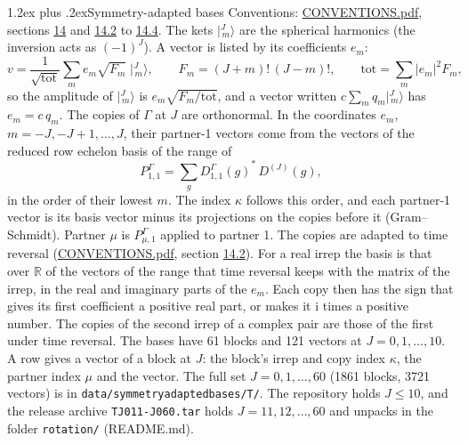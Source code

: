 \documentclass[10pt,a4paper]{article}
\makeatletter
\renewcommand\section{\@startsection{section}{1}{\z@}{-3ex plus -1ex minus -.2ex}%
  {1.2ex plus .2ex}{\normalfont\large\sffamily\bfseries\color{parttitle}}}
\numberwithin{equation}{section}
\newcommand{\iunit}{\mathrm{i}}
\newcommand{\irrJ}[1]{D^{(#1)}}
\newcommand{\repD}[1]{D^{#1}}
\newcommand{\conj}[1]{{#1}^{*}}
\newcommand{\mult}{\kappa}
\newcommand{\intx}{\mu}
\newcommand{\jm}[2]{\bigl\lvert{}^{#1}_{\,#2}\bigr\rangle}
\makeatother
\begin{document}
\section{Symmetry-adapted bases}\label{s:bases}
Conventions: \href{../../CONVENTIONS.pdf}{CONVENTIONS.pdf}, sections \href{../../CONVENTIONS.pdf\#conv.14}{14} and \href{../../CONVENTIONS.pdf\#conv.14.2}{14.2} to \href{../../CONVENTIONS.pdf\#conv.14.4}{14.4}.
\leavevmode\label{n:index.m}\label{n:vector.ket}The kets $\jm{J}{m}$ are the spherical harmonics (the inversion acts as $(-1)^J$). \label{n:index.ketcoefficient}\label{n:vector.basis.symmetry}\label{n:index.ketweight}\label{n:index.total}A vector is listed by its coefficients $e_m$:
\begin{equation}\label{e:ket}v = \frac{1}{\sqrt{\mathrm{tot}}}\sum_m e_m\sqrt{F_m}\;\jm{J}{m},\qquad F_m = (J+m)!\,(J-m)!,\qquad \mathrm{tot} = \sum_m |e_m|^2F_m,\end{equation}
\leavevmode\label{n:index.factor.c}\label{n:index.multiplicity.copies}so the amplitude of $\jm{J}{m}$ is $e_m\sqrt{F_m/\mathrm{tot}}$, and a vector written $c\sum_m q_m\jm{J}{m}$ has $e_m = c\,q_m$.
The copies of $\Gamma$ at $J$ are orthonormal. \label{n:matrix.projector}In the coordinates $e_m$, $m = -J, -J+1, \dots, J$, their partner-1 vectors come from the vectors of the reduced row echelon basis of the range of
\begin{equation}\label{e:projector}P^\Gamma_{1,1} = \sum_g \conj{\repD{\Gamma}_{1,1}(g)}\,\irrJ{J}(g),\end{equation}
in the order of their lowest $m$. The index $\mult$ follows this order, and each partner-1 vector is its basis vector minus its projections on the copies before it (Gram--Schmidt). Partner $\intx$ is $P^\Gamma_{\intx,1}$ applied to partner 1. The copies are adapted to time reversal (\href{../../CONVENTIONS.pdf}{CONVENTIONS.pdf}, section \href{../../CONVENTIONS.pdf\#conv.14.2}{14.2}). For a real irrep the basis is that over $\mathbb{R}$ of the vectors of the range that time reversal keeps with the matrix of the irrep, in the real and imaginary parts of the $e_m$. Each copy then has the sign that gives its first coefficient a positive real part, or makes it $\iunit$ times a positive number. The copies of the second irrep of a complex pair are those of the first under time reversal.
The bases have 61 blocks and 121 vectors at $J = 0, 1, \dots, 10$. \label{n:head.vector}A row gives a vector of a block at $J$: the block's irrep and copy index $\mult$, the partner index $\intx$ and the vector. The full set $J = 0, 1, \dots, 60$ (1861 blocks, 3721 vectors) is in \texttt{data/symmetryadaptedbases/T/}. The repository holds $J \le 10$, and the release archive \texttt{TJ011-J060.tar} holds $J = 11, 12, \dots, 60$ and unpacks in the folder \texttt{rotation/} (README.md).
\end{document}
